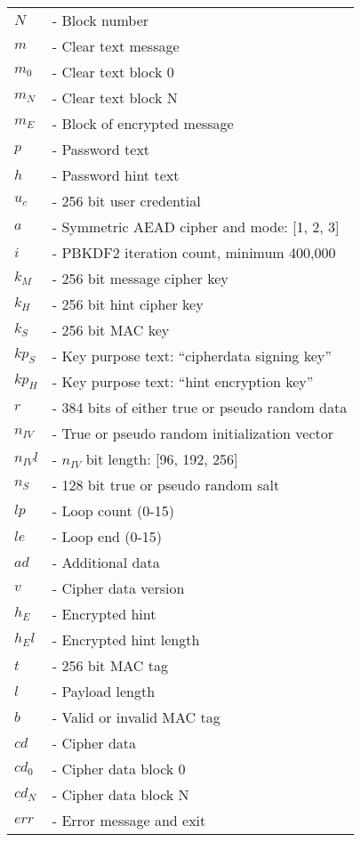 \documentclass{article}
\begin{document}
\begin{tabular}{@{}p{2mm} l}
$N$ & \textrm{ - Block number}\\
$m$ & \textrm{ - Clear text message}\\
$m_0$ & \textrm{ - Clear text block 0}\\
$m_N$ & \textrm{ - Clear text block N}\\
$m_{E}$ & \textrm{ - Block of encrypted message}\\
$p$ & \textrm{ - Password text}\\
$h$ & \textrm{ - Password hint text}\\
$u_c$ & \textrm{ - 256 bit user credential}\\
$a$ & \textrm{ - Symmetric AEAD cipher and mode: [1, 2, 3]}\\
$i$ & \textrm{ - PBKDF2 iteration count, minimum 400,000}\\
$k_M$ & \textrm{ - 256 bit message cipher key}\\
$k_H$ & \textrm{ - 256 bit hint cipher key}\\
$k_S$ & \textrm{ - 256 bit MAC key}\\
$kp_S$ & \textrm{ - Key purpose text: ``cipherdata signing key''}\\
$kp_H$ & \textrm{ - Key purpose text: ``hint encryption key''}\\
$r$ & \textrm{ - 384 bits of either true or pseudo random data}\\
$n_{IV}$ & \textrm{ - True or pseudo random initialization vector}\\
$n_{IV}l$ & \textrm{ - }$n_{IV}$\textrm{ bit length: [96, 192, 256]}\\
$n_S$ & \textrm{ - 128 bit true or pseudo random salt}\\
$lp$ & \textrm{ - Loop count (0-15)}\\
$le$ & \textrm{ - Loop end (0-15)}\\
$ad$ & \textrm{ - Additional data}\\
$v$ & \textrm{ - Cipher data version}\\
$h_E$ & \textrm{ - Encrypted hint}\\
$h_El$ & \textrm{ - Encrypted hint length}\\
$t$ & \textrm{ - 256 bit MAC tag}\\
$l$ & \textrm{ - Payload length}\\
$b$ & \textrm{ - Valid or invalid MAC tag}\\
$cd$ & \textrm{ - Cipher data}\\
$cd_0$ & \textrm{ - Cipher data block 0}\\
$cd_N$ & \textrm{ - Cipher data block N}\\
$err$ & \textrm{ - Error message and exit}\\
\end{tabular}
\end{document}

